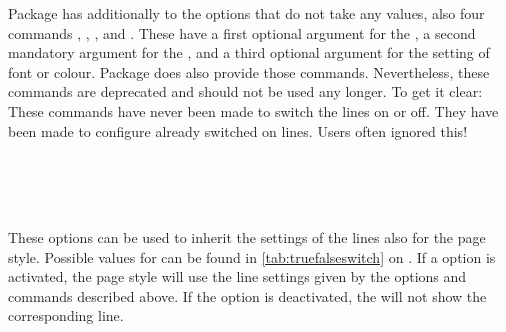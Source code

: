 %
%
%
%
Package  has additionally to the options that do not take
any values, also four commands
,
,
, and
. These have a first
optional argument for the , a second mandatory argument for the
, and a third optional argument for the setting of font or
colour. Package  does also provide those
commands. Nevertheless, these commands are deprecated and should not be used
any longer. To get it clear: These commands have never been made to
switch the lines on or off. They have been made to configure already switched
on lines. Users often ignored this!%
%
%
%
%
%
%
%
%
%


\begin{Declaration}
  \\
  \\
  \\
\end{Declaration}
%
%
%
%
These options can be used to inherit the settings of the lines also for the
 page style. Possible values for  can be
found in \autoref{tab:truefalseswitch} on
. If a option is activated, the
 page style will use the line settings given by the options
and commands described above. If the option is deactivated, the
 will not show the corresponding line.%
%
%
%
%

